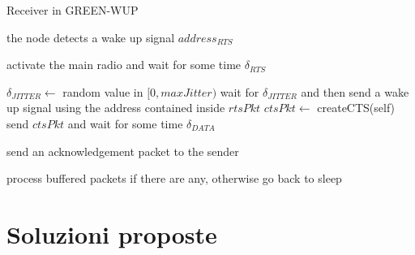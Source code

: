 \documentclass[binding=0.6cm,TFA]{sapthesis}
\begin{document}
\begin{algorithm}
    \caption{Receiver in GREEN-WUP}
    \begin{algorithmic}
        \REQUIRE the node detects a wake up signal $address_{RTS}$


            \STATE activate the main radio and wait for some time $\delta_{RTS}$

                \STATE $\delta_{JITTER} \leftarrow$ random value in $[0,maxJitter)$
                \STATE wait for $\delta_{JITTER}$ and then send a wake up signal using the address contained inside $rtsPkt$
                \STATE $ctsPkt \leftarrow$ createCTS(self)
                \STATE send $ctsPkt$ and wait for some time $\delta_{DATA}$

                    \STATE send an acknowledgement packet to the sender
                \ENDIF
            \ENDIF

            \STATE process buffered packets if there are any, otherwise go back to sleep
        
    \end{algorithmic}
\end{algorithm}


\chapter{Soluzioni proposte}
\end{document}
